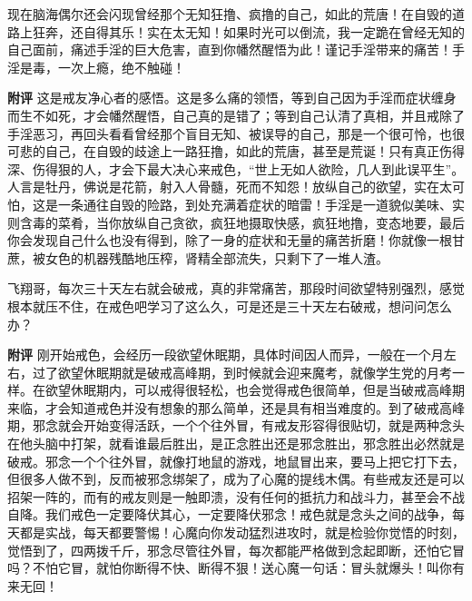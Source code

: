 \begin{case}
    现在脑海偶尔还会闪现曾经那个无知狂撸、疯撸的自己，如此的荒唐！在自毁的道路上狂奔，还自得其乐！实在太无知！如果时光可以倒流，我一定跪在曾经无知的自己面前，痛述手淫的巨大危害，直到你幡然醒悟为此！谨记手淫带来的痛苦！手淫是毒，一次上瘾，绝不触碰！

    \textbf{附评} 这是戒友净心者的感悟。这是多么痛的领悟，等到自己因为手淫而症状缠身而生不如死，才会幡然醒悟，自己真的是错了；等到自己认清了真相，并且戒除了手淫恶习，再回头看看曾经那个盲目无知、被误导的自己，那是一个很可怜，也很可悲的自己，在自毁的歧途上一路狂撸，如此的荒唐，甚至是荒诞！只有真正伤得深、伤得狠的人，才会下最大决心来戒色，“世上无如人欲险，几人到此误平生”。人言是牡丹，佛说是花箭，射入人骨髓，死而不知怨！放纵自己的欲望，实在太可怕，这是一条通往自毁的险路，到处充满着症状的暗雷！手淫是一道貌似美味、实则含毒的菜肴，当你放纵自己贪欲，疯狂地摄取快感，疯狂地撸，变态地要，最后你会发现自己什么也没有得到，除了一身的症状和无量的痛苦折磨！你就像一根甘蔗，被女色的机器残酷地压榨，肾精全部流失，只剩下了一堆人渣。
\end{case}

\begin{case}
    飞翔哥，每次三十天左右就会破戒，真的非常痛苦，那段时间欲望特别强烈，感觉根本就压不住，在戒色吧学习了这么久，可是还是三十天左右破戒，想问问怎么办？

    \textbf{附评} 刚开始戒色，会经历一段欲望休眠期，具体时间因人而异，一般在一个月左右，过了欲望休眠期就是破戒高峰期，到时候就会迎来魔考，就像学生党的月考一样。在欲望休眠期内，可以戒得很轻松，也会觉得戒色很简单，但是当破戒高峰期来临，才会知道戒色并没有想象的那么简单，还是具有相当难度的。到了破戒高峰期，邪念就会开始变得活跃，一个个往外冒，有戒友形容得很贴切，就是两种念头在他头脑中打架，就看谁最后胜出，是正念胜出还是邪念胜出，邪念胜出必然就是破戒。邪念一个个往外冒，就像打地鼠的游戏，地鼠冒出来，要马上把它打下去，但很多人做不到，反而被邪念绑架了，成为了心魔的提线木偶。有些戒友还是可以招架一阵的，而有的戒友则是一触即溃，没有任何的抵抗力和战斗力，甚至会不战自降。我们戒色一定要降伏其心，一定要降伏邪念！戒色就是念头之间的战争，每天都是实战，每天都要警惕！心魔向你发动猛烈进攻时，就是检验你觉悟的时刻，觉悟到了，四两拨千斤，邪念尽管往外冒，每次都能严格做到念起即断，还怕它冒吗？不怕它冒，就怕你断得不快、断得不狠！送心魔一句话：冒头就爆头！叫你有来无回！
\end{case}

